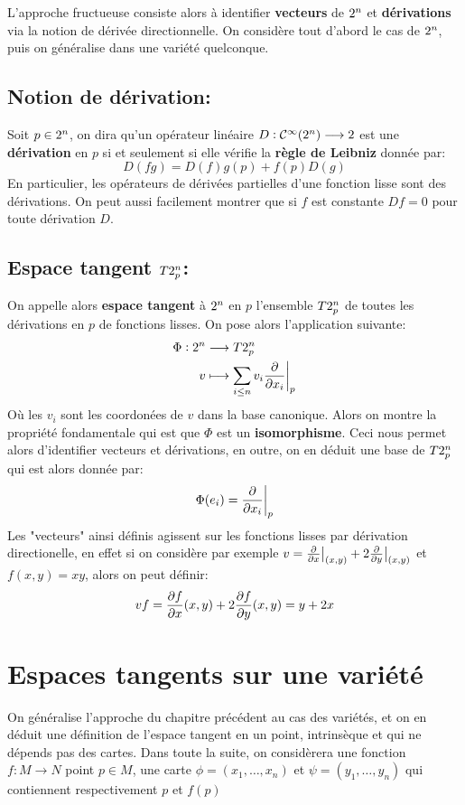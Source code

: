    L'approche fructueuse consiste alors à identifier \textbf{vecteurs} de \( 2^n \) et \textbf{dérivations} via la notion de dérivée directionnelle. On considère tout d'abord le cas de \( 2^n \), puis on généralise dans une variété quelconque.
   \section{Notion de dérivation:}
      Soit \(p \in 2^n\), on dira qu'un opérateur linéaire \( D: \mathcal{C}^\infty(2^n) \longrightarrow 2 \) est une \textbf{dérivation} en \( p \) si et seulement si elle vérifie la \textbf{règle de Leibniz} donnée par:
      \[ 
         D(fg) = D(f)g(p) + f(p)D(g) 
      \]
      En particulier, les opérateurs de dérivées partielles d'une fonction lisse sont des dérivations. On peut aussi facilement montrer que si \( f \) est constante \( Df = 0 \) pour toute dérivation \( D \).
   \section{Espace tangent \( T2^n_p \):}
      On appelle alors \textbf{espace tangent} à \( 2^n \) en \( p \) l'ensemble \( T2^n_p \) de toutes les dérivations en \( p \) de fonctions lisses. On pose alors l'application suivante:
      \[ 
         \begin{aligned}
            \Phi : 2^n &\longrightarrow T2^n_p \\
            v &\longmapsto \sum_{i \leq n} v_i \frac{\partial }{\partial x_i}\biggr|_p
         \end{aligned} 
      \]
      Où les \( v_i \) sont les coordonées de \( v \) dans la base canonique. Alors on montre la propriété fondamentale qui est que \( \Phi \) est un \textbf{isomorphisme}. Ceci nous permet alors d'identifier vecteurs et dérivations, en outre, on en déduit une base de \( T2^n_p \) qui est alors donnée par:
      \[ 
         \Phi(e_i) = \frac{\partial }{\partial x_i}\biggr|_p
      \] 
      Les "vecteurs" ainsi définis agissent sur les fonctions lisses par dérivation directionelle, en effet si on considère par exemple \( v = \frac{\partial }{\partial x}\big|_{(x, y)} + 2\frac{\partial }{\partial y}\big|_{(x, y)}\) et \( f(x, y) = xy \), alors on peut définir:
      \[ 
         vf = \frac{\partial f}{\partial x}(x, y) + 2\frac{\partial f}{\partial y}(x, y) = y + 2x
      \]
\chapter{Espaces tangents sur une variété}
   On généralise l'approche du chapitre précédent au cas des variétés, et on en déduit une définition de l'espace tangent en un point, intrinsèque et qui ne dépends pas des cartes. Dans toute la suite, on considèrera une fonction \( f : M \longrightarrow N \) point \( p \in M \), une carte \( \phi = (x_1, \ldots, x_n) \) et \( \psi = (y_1, \ldots, y_n) \) qui contiennent respectivement \( p \) et \( f(p) \)
